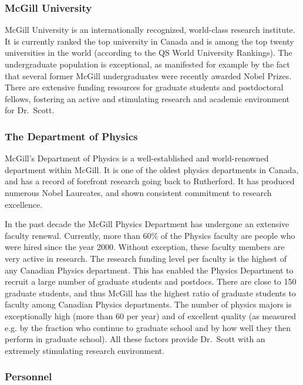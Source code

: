 \documentclass[10pt,oneside,onecolumn,a4paper]{article}
\begin{document}
\bigskip

\subsubsection*{McGill University}

McGill University is an internationally recognized, world-class
research institute. It is currently ranked the top university in
Canada and is among the top twenty universities in the world (according
to the QS World University Rankings). The undergraduate population
is exceptional, as manifested for example by the fact that several
former McGill undergraduates were recently awarded Nobel Prizes. There
are extensive funding resources for graduate students and postdoctoral
fellows, fostering an active and stimulating research and
academic environment for Dr.\ Scott.

\subsubsection*{The Department of Physics}

McGill's Department of Physics is a well-established and world-renowned
department within McGill. It is one of the oldest physics departments
in Canada, and has a record of forefront research going back to
Rutherford.  It has produced numerous Nobel Laureates, and shown
consistent commitment to research excellence.

In the past decade the McGill Physics Department has undergone an
extensive faculty renewal. Currently, more than 60\% of the Physics
faculty are people who were hired since the year 2000. Without
exception, these faculty members are very active in research. The research
funding level per faculty is the highest of any Canadian Physics department.
This has enabled the Physics Department to recruit a large number
of graduate students and postdocs. There are close to 150 graduate
students, and thus McGill has the highest ratio of graduate students
to faculty among Canadian Physics departments. The number of physics
majors is exceptionally high (more than 60 per year) and of excellent
quality (as measured e.g. by the fraction who continue to graduate
school and by how well they then perform in graduate school). All
these factors provide Dr.\ Scott with an extremely stimulating research
environment.

\subsubsection*{Personnel}
\end{document}
